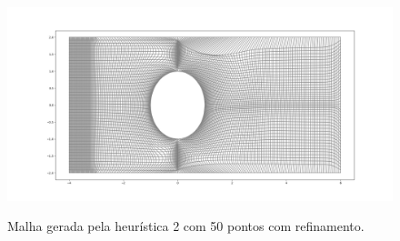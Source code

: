 \documentclass[a4paper]{article}
\begin{document}
\begin{figure}[H]
	\centering
	\includegraphics[width=1.0\textwidth]{heuristica_2_50pts_refined.png}
	\label{fig:heuristic2_100pts_refined} 
	\caption[caption]{Malha gerada pela heurística 2 com 50 pontos com refinamento.}
\end{figure}
\end{document}
